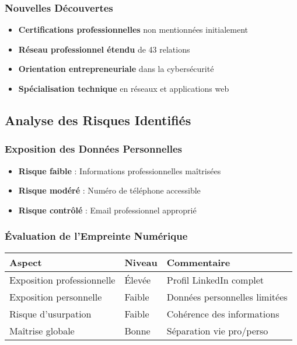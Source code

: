 \documentclass[12pt, a4paper]{article}
\begin{document}
\subsubsection{Nouvelles Découvertes}
\begin{itemize}
    \item \textbf{Certifications professionnelles} non mentionnées initialement
    \item \textbf{Réseau professionnel étendu} de 43 relations
    \item \textbf{Orientation entrepreneuriale} dans la cybersécurité
    \item \textbf{Spécialisation technique} en réseaux et applications web
\end{itemize}

\subsection{Analyse des Risques Identifiés}
\subsubsection{Exposition des Données Personnelles}
\begin{itemize}
    \item \textbf{Risque faible} : Informations professionnelles maîtrisées
    \item \textbf{Risque modéré} : Numéro de téléphone accessible
    \item \textbf{Risque contrôlé} : Email professionnel approprié
\end{itemize}

\subsubsection{Évaluation de l'Empreinte Numérique}
\begin{table}[H]
\centering
\begin{tabular}{|p{4cm}|p{4cm}|p{4cm}|}
\hline
\textbf{Aspect} & \textbf{Niveau} & \textbf{Commentaire} \\
\hline
Exposition professionnelle & Élevée & Profil LinkedIn complet \\
\hline
Exposition personnelle & Faible & Données personnelles limitées \\
\hline
Risque d'usurpation & Faible & Cohérence des informations \\
\hline
Maîtrise globale & Bonne & Séparation vie pro/perso \\
\hline
\end{tabular}
\end{table}
\end{document}
